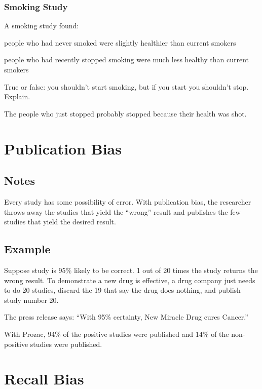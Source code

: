 \documentclass[landscape]{exam}
\begin{document}
  \subsubsection{Smoking Study}
  A smoking study found:
  \begin{itemize*}
    \item people who had never smoked were slightly healthier than current
      smokers
    \item people who had recently stopped smoking were much less healthy than
      current smokers
  \end{itemize*}

  True or false: you shouldn't start smoking, but if you start you shouldn't
  stop.  Explain.

  \begin{solution}
    The people who just stopped probably stopped because their health was shot.
  \end{solution}

  \section{Publication Bias}
  \subsection{Notes}
  Every study has some possibility of error.  With publication bias, the
  researcher throws away the studies that yield the ``wrong'' result and
  publishes the few studies that yield the desired result. 

  \subsection{Example}

  Suppose study is 95\% likely to be correct.  1 out of 20 times the study
  returns the wrong result. To demonstrate a new drug is effective, a drug
  company just needs to do 20 studies, discard the 19 that say the drug does
  nothing, and publish study number 20.

  The press release says: ``With 95\% certainty, New Miracle Drug cures Cancer.''

  With Prozac, 94\% of the positive studies were published and 14\% of the
  non-positive studies were published.

  \section{Recall Bias}
\end{document}
